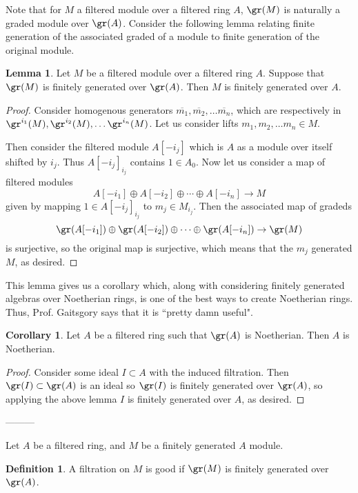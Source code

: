 \documentclass[12 pt]{article}
\theoremstyle{definition}
\newtheorem{cor}[thm]{Corollary}
\newtheorem{lemma}[thm]{Lemma}
\newtheorem{defn}[thm]{Definition}
\renewcommand{\(}{\left(}
\renewcommand{\)}{\right)}
\newcommand\ol{\overline}
\begin{document}
Note that for $M$ a filtered module over a filtered ring $A$, $\gr(M)$ is naturally a graded module over $\gr(A)$. Consider the following lemma relating finite generation of the associated graded of a module to finite generation of the original module.

\begin{lemma} Let $M$ be a filtered module over a filtered ring $A$. Suppose that $\gr(M)$ is finitely generated over $\gr(A)$. Then $M$ is finitely generated over $A$.
\end{lemma}

\begin{proof} Consider homogenous generators $\ol{m_1}, \ol{m_2}, \ldots \ol{m_n}$, which are respectively in $\\ \gr^{i_1}(M), \gr^{i_2}(M), \ldots \gr^{i_n}(M)$. Let us consider lifts $m_1, m_2, \ldots m_n \in M$.

Then consider the filtered module $A[-i_j]$ which is $A$ as a module over itself shifted by $i_j$. Thus $A[-i_j]_{i_j}$ contains $1 \in A_0$. Now let us consider a map of filtered modules
\[A[-i_1] \oplus A[-i_2] \oplus \cdots \oplus A[-i_n] \to M\]
given by mapping $1 \in A[-i_j]_{i_j}$ to $m_{j} \in M_{i_j}$. Then the associated map of gradeds
\[\gr(A[-i_1]) \oplus \gr(A[-i_2]) \oplus \cdots \oplus \gr(A[-i_n]) \to \gr(M)\]
is surjective, so the original map is surjective, which means that the $m_j$ generated $M$, as desired.
\end{proof}

This lemma gives us a corollary which, along with considering finitely generated algebras over Noetherian rings, is one of the best ways to create Noetherian rings. Thus, Prof. Gaitsgory says that it is ``pretty damn useful".

\begin{cor} Let $A$ be a filtered ring such that $\gr(A)$ is Noetherian. Then $A$ is Noetherian.
\end{cor}
\begin{proof} Consider some ideal $I \subset A$ with the induced filtration. Then $\gr(I) \subset \gr(A)$ is an ideal so $\gr(I)$ is finitely generated over $\gr(A)$, so applying the above lemma $I$ is finitely generated over $A$, as desired.
\end{proof}


---------

Let $A$ be a filtered ring, and $M$ be a finitely generated $A$ module.

\begin{defn} A filtration on $M$ is good if $\gr(M)$ is finitely generated over $\gr(A)$.
\end{defn}
\end{document}
